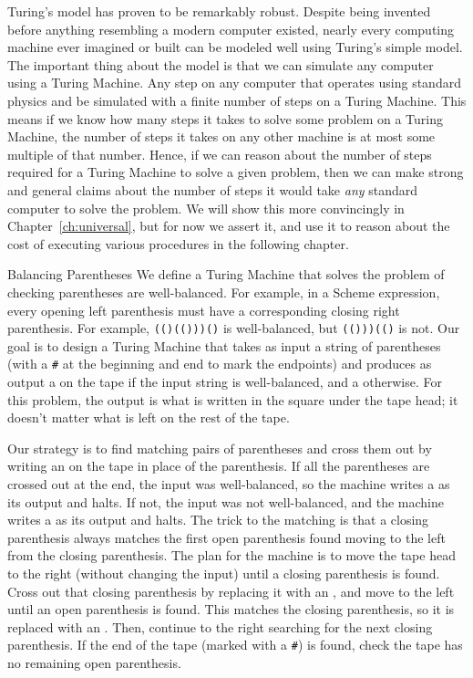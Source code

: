 \begin{schemeregion}
Turing's model has proven to be remarkably robust.  Despite being invented before anything resembling a modern computer existed, nearly every computing machine ever imagined or built can be modeled well using Turing's simple model.  The important thing about the model is that we can simulate any computer using a Turing Machine.  Any step on any computer that operates using standard physics and be simulated with a finite number of steps on a Turing Machine.  This means if we know how many steps it takes to solve some problem on a Turing Machine, the number of steps it takes on any other machine is at most some multiple of that number.  Hence, if we can reason about the number of steps required for a Turing Machine to solve a given problem, then we can make strong and general claims about the number of steps it would take \emph{any} standard computer to solve the problem.  We will show this more convincingly in Chapter~\ref{ch:universal}, but for now we assert it, and use it to reason about the cost of executing various procedures in the following chapter.

\begin{examplenobar}{Balancing Parentheses}
We define a Turing Machine that solves the problem of checking parentheses are well-balanced.  For example, in a Scheme expression, every opening left parenthesis must have a corresponding closing right parenthesis.  For example, \verb|(()(()))()| is well-balanced, but \verb|(()))(()| is not.  Our goal is to design a Turing Machine that takes as input a string of parentheses (with a {\tt \#} at the beginning and end to mark the endpoints) and produces as output a  on the tape if the input string is well-balanced, and a  otherwise.  For this problem, the output is what is written in the square under the tape head; it doesn't matter what is left on the rest of the tape.

Our strategy is to find matching pairs of parentheses and cross them out by writing an  on the tape in place of the parenthesis.  If all the parentheses are crossed out at the end, the input was well-balanced, so the machine writes a  as its output and halts.  If not, the input was not well-balanced, and the machine writes a {} as its output and halts.  The trick to the matching is that a closing parenthesis always matches the first open parenthesis found moving to the left from the closing parenthesis.  The plan for the machine is to move the tape head to the right (without changing the input) until a closing parenthesis is found.  Cross out that closing parenthesis by replacing it with an , and move to the left until an open parenthesis is found.  This matches the closing parenthesis, so it is replaced with an .  Then, continue to the right searching for the next closing parenthesis.  If the end of the tape (marked with a {\tt \#}) is found, check the tape has no remaining open parenthesis.


\end{examplenobar}
\end{schemeregion}
